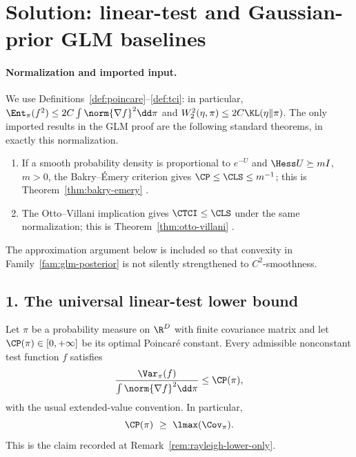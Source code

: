 \documentclass[../main.tex]{subfiles}
\begin{document}

\section*{Solution: linear-test and Gaussian-prior GLM baselines}
\label{sec:sol-glm-linear-baselines}

\paragraph{Normalization and imported input.}
We use Definitions~\ref{def:poincare}--\ref{def:tci}: in particular,
\(\Ent_\pi(f^2)\le 2C\int\norm{\nabla f}^2\dd\pi\) and
\(W_2^2(\eta,\pi)\le2C\KL(\eta\|\pi)\).  The only imported results in the
GLM proof are the following standard theorems, in exactly this normalization.

\begin{enumerate}[leftmargin=1.7em]
  \item If a smooth probability density is proportional to \(e^{-U}\) and
  \(\Hess U\succeq mI\), \(m>0\), the Bakry--\'Emery criterion gives
  \(\CP\le\CLS\le m^{-1}\); this is Theorem~\ref{thm:bakry-emery}
  \cite{BakryEmery1985,BakryGentilLedoux2014}.
  \item The Otto--Villani implication gives \(\CTCI\le\CLS\) under the same
  normalization; this is Theorem~\ref{thm:otto-villani}
  \cite{OttoVillani2000,Villani2008}.
\end{enumerate}

The approximation argument below is included so that convexity in
Family~\ref{fam:glm-posterior} is not silently strengthened to \(C^2\)-smoothness.

\subsection*{1. The universal linear-test lower bound}

\begin{lemma}
\label{lem:sol-linear-test-lower}
Let \(\pi\) be a probability measure on \(\R^D\) with finite covariance matrix and let
\(\CP(\pi)\in[0,+\infty]\) be its optimal Poincar\'e constant.  Every admissible nonconstant
test function \(f\) satisfies
\[
 \frac{\Var_\pi(f)}{\int\norm{\nabla f}^2\dd\pi}\le \CP(\pi),
\]
with the usual extended-value convention.  In particular,
\[
 \CP(\pi)\ \ge\ \lmax(\Cov_\pi).
\]
This is the claim recorded at Remark~\ref{rem:rayleigh-lower-only}.
\end{lemma}
\end{document}
